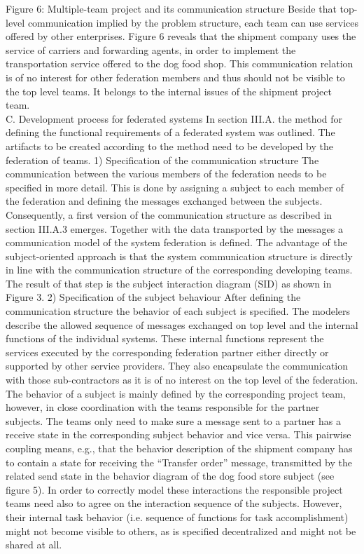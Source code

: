 Figure 6: Multiple-team project and its communication structure
Beside that top-level communication implied by the problem structure, each team can use services offered by other enterprises. Figure 6 reveals that the shipment company uses the service of carriers and forwarding agents, in order to implement the transportation service offered to the dog food shop. This communication relation is of no interest for other federation members and thus should not be visible to the top level teams. It belongs to the internal issues of the shipment project team.
\\
C.	Development process for federated systems
In section III.A. the method for defining the functional requirements of a federated system was outlined. The artifacts to be created according to the method need to be developed by the federation of teams.
1)	Specification of the communication structure
The communication between the various members of the federation needs to be specified in more detail. This is done by assigning a subject to each member of the federation and defining the messages exchanged between the subjects. Consequently, a first version of the communication structure as described in section III.A.3 emerges. Together with the data transported by the messages a communication model of the system federation is defined. The advantage of the subject-oriented approach is that the system communication structure is directly in line with the communication structure of the corresponding developing teams. The result of that step is the subject interaction diagram (SID) as shown in Figure 3. 
2)	Specification of the subject behaviour
After defining the communication structure the behavior of each subject is specified. The modelers describe the allowed sequence of messages exchanged on top level and the internal functions of the individual systems. These internal functions represent the services executed by the corresponding federation partner either directly or supported by other service providers. They also encapsulate the communication with those sub-contractors as it is of no interest on the top level of the federation.
The behavior of a subject is mainly defined by the corresponding project team, however, in close coordination with the teams responsible for the partner subjects. The teams only need to make sure a message sent to a partner has a receive state in the corresponding subject behavior and vice versa. This pairwise coupling means, e.g., that the behavior description of the shipment company has to contain a state for receiving the “Transfer order” message, transmitted by the related send state in the behavior diagram of the dog food store subject (see figure 5). In order to correctly model these interactions the responsible project teams need also to agree on the interaction sequence of the subjects. However, their internal task behavior (i.e. sequence of functions for task accomplishment) might not become visible to others, as is specified decentralized and might not be shared at all. 
